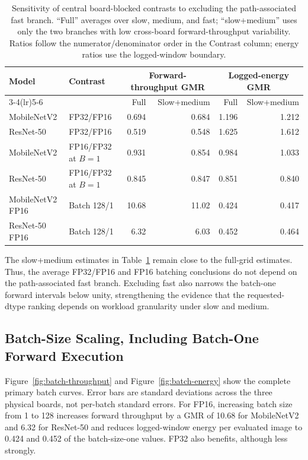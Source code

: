 \documentclass[electronics,article,submit,pdftex,moreauthors]{Definitions/mdpi}
\newcommand{\mobile}{MobileNetV2}
\newcommand{\resnet}{ResNet-50}
\providecommand{\figref}[1]{Figure~\ref{#1}}
\renewcommand{\tabref}[1]{Table~\ref{#1}}
\begin{document}
\begin{table}[t]
\caption{Sensitivity of central board-blocked contrasts to excluding the path-associated fast branch. ``Full'' averages over slow, medium, and fast; ``slow+medium'' uses only the two branches with low cross-board forward-throughput variability. Ratios follow the numerator/denominator order in the Contrast column; energy ratios use the logged-window boundary.}
\label{tab:no-fast-sensitivity}
\centering
\small
\setlength{\tabcolsep}{4pt}
\begin{tabular}{llrrrr}
\toprule
Model & Contrast & \multicolumn{2}{c}{Forward-throughput GMR} & \multicolumn{2}{c}{Logged-energy GMR} \\
\cmidrule(lr){3-4}\cmidrule(lr){5-6}
 & & Full & Slow+medium & Full & Slow+medium \\
\midrule
\mobile{} & FP32/FP16 & 0.694 & 0.684 & 1.196 & 1.212 \\
\resnet{} & FP32/FP16 & 0.519 & 0.548 & 1.625 & 1.612 \\
\mobile{} & FP16/FP32 at $B=1$ & 0.931 & 0.854 & 0.984 & 1.033 \\
\resnet{} & FP16/FP32 at $B=1$ & 0.845 & 0.847 & 0.851 & 0.840 \\
\mobile{} FP16 & Batch 128/1 & 10.68 & 11.02 & 0.424 & 0.417 \\
\resnet{} FP16 & Batch 128/1 & 6.32 & 6.03 & 0.452 & 0.464 \\
\bottomrule
\end{tabular}
\end{table}

The slow+medium estimates in \tabref{tab:no-fast-sensitivity} remain close to the full-grid estimates. Thus, the average FP32/FP16 and FP16 batching conclusions do not depend on the path-associated fast branch. Excluding fast also narrows the batch-one forward intervals below unity, strengthening the evidence that the requested-dtype ranking depends on workload granularity under slow and medium.

\subsection{Batch-Size Scaling, Including Batch-One Forward Execution}

\figref{fig:batch-throughput} and \figref{fig:batch-energy} show the complete primary batch curves. Error bars are standard deviations across the three physical boards, not per-batch standard errors. For FP16, increasing batch size from 1 to 128 increases forward throughput by a GMR of 10.68 for \mobile{} and 6.32 for \resnet{} and reduces logged-window energy per evaluated image to 0.424 and 0.452 of the batch-size-one values. FP32 also benefits, although less strongly.
\end{document}
